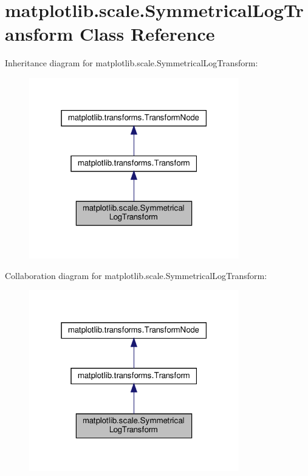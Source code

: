\hypertarget{classmatplotlib_1_1scale_1_1SymmetricalLogTransform}{}\section{matplotlib.\+scale.\+Symmetrical\+Log\+Transform Class Reference}
\label{classmatplotlib_1_1scale_1_1SymmetricalLogTransform}


Inheritance diagram for matplotlib.\+scale.\+Symmetrical\+Log\+Transform\+:
\nopagebreak
\begin{figure}[H]
\begin{center}
\leavevmode
\includegraphics[width=259pt]{classmatplotlib_1_1scale_1_1SymmetricalLogTransform__inherit__graph}
\end{center}
\end{figure}


Collaboration diagram for matplotlib.\+scale.\+Symmetrical\+Log\+Transform\+:
\nopagebreak
\begin{figure}[H]
\begin{center}
\leavevmode
\includegraphics[width=259pt]{classmatplotlib_1_1scale_1_1SymmetricalLogTransform__coll__graph}
\end{center}
\end{figure}
